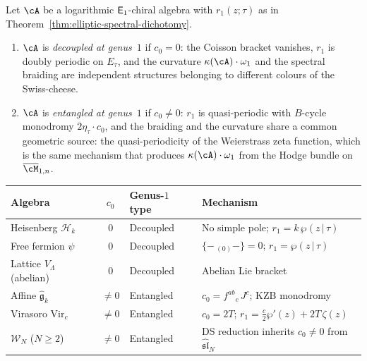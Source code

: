 \begin{definition}
\label{def:decoupled-entangled}
Let $\cA$ be a logarithmic $\mathsf{E}_1$-chiral algebra with
$r_1(z;\tau)$ as in
Theorem~\ref{thm:elliptic-spectral-dichotomy}.
\begin{enumerate}[label=\textup{(\roman*)}]
\item $\cA$ is \emph{decoupled at genus~$1$} if $c_0=0$:
 the Coisson bracket vanishes, $r_1$ is doubly periodic on
 $E_\tau$, and the curvature $\kappa(\cA)\cdot\omega_1$
 and the spectral braiding are independent structures
 belonging to different colours of the Swiss-cheese.

\item $\cA$ is \emph{entangled at genus~$1$} if $c_0\ne 0$:
 $r_1$ is quasi-periodic with $B$-cycle monodromy
 $2\eta_\tau\cdot c_0$, and the braiding and the curvature
 share a common geometric source: the quasi-periodicity
 of the Weierstrass zeta function, which is the same
 mechanism that produces $\kappa(\cA)\cdot\omega_1$ from the
 Hodge bundle on $\overline{\cM}_{1,n}$.
\end{enumerate}
\end{definition}

\begin{center}
\begin{tabular}{l@{\quad}c@{\quad}l@{\quad}l}
\toprule
\textbf{Algebra} & $c_0$ & \textbf{Genus-$1$ type} & \textbf{Mechanism} \\
\midrule
Heisenberg $\mathcal{H}_k$ & $0$ & Decoupled &
 No simple pole; $r_1=k\,\wp(z\,|\,\tau)$ \\
Free fermion $\psi$ & $0$ & Decoupled &
 $\{-\,{}_{(0)}-\}=0$; $r_1=\wp(z\,|\,\tau)$ \\
Lattice $V_\Lambda$ (abelian) & $0$ & Decoupled &
 Abelian Lie bracket \\[4pt]
Affine $\widehat{\mathfrak{g}}_k$ & $\ne 0$ & Entangled &
 $c_0=f^{ab}{}_c\,J^c$; KZB monodromy \\
Virasoro $\mathrm{Vir}_c$ & $\ne 0$ & Entangled &
 $c_0=2T$; $r_1=\tfrac{c}{2}\wp'(z)+2T\,\zeta(z)$ \\
$\mathcal{W}_N$ ($N\ge 2$) & $\ne 0$ & Entangled &
 DS reduction inherits $c_0\ne 0$ from $\widehat{\mathfrak{sl}}_N$ \\
\bottomrule
\end{tabular}
\end{center}

